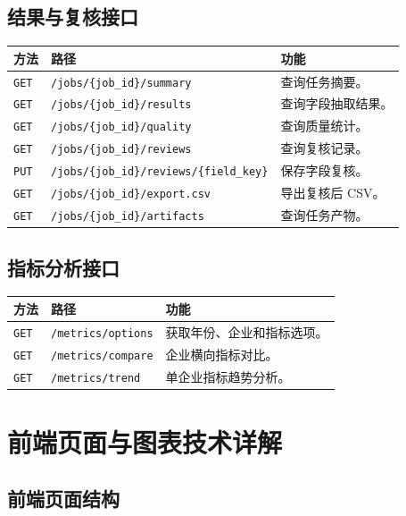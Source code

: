 \documentclass[UTF8,a4paper,12pt]{ctexart}
\newenvironment{manualtable}[1]{%
  \small
  \begin{longtable}{#1}
}{%
  \end{longtable}
  \normalsize
}
\begin{document}
\subsection{结果与复核接口}

\begin{manualtable}{p{2.5cm}p{6.5cm}p{5.5cm}}
\toprule
\textbf{方法} & \textbf{路径} & \textbf{功能} \\
\midrule
\endhead
\texttt{GET} & \texttt{/jobs/\{job\_id\}/summary} & 查询任务摘要。 \\
\texttt{GET} & \texttt{/jobs/\{job\_id\}/results} & 查询字段抽取结果。 \\
\texttt{GET} & \texttt{/jobs/\{job\_id\}/quality} & 查询质量统计。 \\
\texttt{GET} & \texttt{/jobs/\{job\_id\}/reviews} & 查询复核记录。 \\
\texttt{PUT} & \texttt{/jobs/\{job\_id\}/reviews/}\newline\texttt{\{field\_key\}} & 保存字段复核。 \\
\texttt{GET} & \texttt{/jobs/\{job\_id\}/export.csv} & 导出复核后 CSV。 \\
\texttt{GET} & \texttt{/jobs/\{job\_id\}/artifacts} & 查询任务产物。 \\
\bottomrule
\end{manualtable}

\subsection{指标分析接口}

\begin{manualtable}{p{2.5cm}p{6cm}p{6cm}}
\toprule
\textbf{方法} & \textbf{路径} & \textbf{功能} \\
\midrule
\endhead
\texttt{GET} & \texttt{/metrics/options} & 获取年份、企业和指标选项。 \\
\texttt{GET} & \texttt{/metrics/compare} & 企业横向指标对比。 \\
\texttt{GET} & \texttt{/metrics/trend} & 单企业指标趋势分析。 \\
\bottomrule
\end{manualtable}

\section{前端页面与图表技术详解}

\subsection{前端页面结构}
\end{document}

